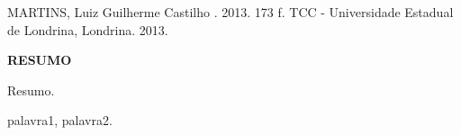 
\newpage
\singlespacing
		\noindent MARTINS, Luiz Guilherme Castilho {\bf \titulotcc}. 2013. 
                173 f. TCC - Universidade Estadual de Londrina, 
                Londrina. 2013. \\
		\begin{center}
					{\bf {\Large RESUMO}}
		\end{center}

		\noindent Resumo.
    \newline

		 palavra1, palavra2.
